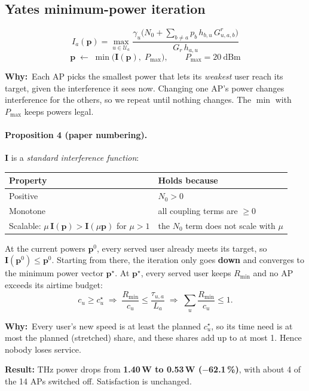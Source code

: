 \documentclass[11pt,a4paper]{article}
\newcommand{\Rmin}{R_{\min}}
\newcommand{\Pmax}{P_{\max}}
\newcommand{\why}[1]{\par\smallskip\noindent\begin{minipage}{\linewidth}\small
  \textcolor{whyc}{\textbf{Why:}}~#1\end{minipage}\par\medskip}
\begin{document}
\subsection{Yates minimum-power iteration}
\begin{keybox}
\[
I_a(\mathbf{p})=\max_{u\in\mathcal{U}_a}
\frac{\gamma_u\Big(N_0+\sum_{b\ne a}p_b\,h_{b,u}\,G^{r}_{u,a,b}\Big)}{G_r\,h_{a,u}}
\]
\[
\mathbf{p}\;\leftarrow\;\min\!\big(\mathbf{I}(\mathbf{p}),\;\Pmax\big),\qquad \Pmax=20\ \text{dBm}
\]
\end{keybox}
\why{Each AP picks the smallest power that lets its \emph{weakest} user reach its target, given the interference it sees now. Changing one AP's power changes interference for the others, so we repeat until nothing changes. The $\min$ with $\Pmax$ keeps powers legal.}

\paragraph{Proposition 4 (paper numbering).} $\mathbf{I}$ is a \emph{standard interference function}:
\begin{center}
\begin{tabular}{@{}ll@{}}
\toprule
Property & Holds because\\
\midrule
Positive & $N_0>0$\\
Monotone & all coupling terms are $\ge0$\\
Scalable: $\mu\,\mathbf{I}(\mathbf{p})>\mathbf{I}(\mu\mathbf{p})$ for $\mu>1$ & the $N_0$ term does not scale with $\mu$\\
\bottomrule
\end{tabular}
\end{center}
At the current powers $\mathbf{p}^0$, every served user already meets its target, so
$\mathbf{I}(\mathbf{p}^0)\le\mathbf{p}^0$. Starting from there, the iteration only goes
\textbf{down} and converges to the minimum power vector $\mathbf{p}^\star$. At
$\mathbf{p}^\star$, every served user keeps $\Rmin$ and no AP exceeds its airtime budget:
\[
c_u\ge c^\star_u
\;\Longrightarrow\;
\frac{\Rmin}{c_u}\le\frac{\tau_{u,a}}{L_a}
\;\Longrightarrow\;
\sum_u\frac{\Rmin}{c_u}\le1 .
\]
\why{Every user's new speed is at least the planned $c^\star_u$, so its time need is at most the planned (stretched) share, and these shares add up to at most 1. Hence nobody loses service.}
\textbf{Result:} THz power drops from \textbf{1.40\,W to 0.53\,W ($-$62.1\,\%)}, with about 4 of
the 14 APs switched off. Satisfaction is unchanged.
\end{document}
